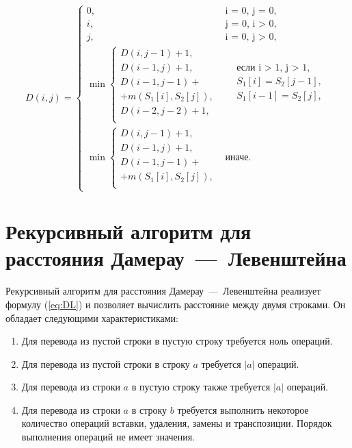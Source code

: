 \begin{equation}
	\label{eq:DL}
	D(i, j) = 
	\begin{cases}
		0, &\text{i = 0, j = 0,}\\
		i, &\text{j = 0, i > 0,}\\
		j, &\text{i = 0, j > 0,}\\
		\min \begin{cases}
			D(i, j - 1) + 1,\\
			D(i - 1, j) + 1,\\
			D(i - 1, j - 1) +\\
			+ m(S_{1}[i], S_{2}[j]),\\
			D(i - 2, j - 2) + 1,\\
		\end{cases}
		& \begin{aligned}
			& \text{если i > 1, j > 1},\\
			& S_{1}[i] = S_{2}[j-1],\\
			& S_{1}[i-1] = S_{2}[j],\\
		\end{aligned}\\
		\min \begin{cases}
			D(i, j - 1) + 1,\\
			D(i - 1, j) + 1,\\
			D(i - 1, j - 1) +\\
			+m(S_{1}[i], S_{2}[j]),\\
		\end{cases}
		 & \text{иначе.}
	\end{cases}
\end{equation}

\section{Рекурсивный алгоритм для расстояния Дамерау~---~Левенштейна}

Рекурсивный алгоритм для расстояния Дамерау~---~Левенштейна реализует формулу (\ref{eq:DL}) и позволяет вычислить расстояние между двумя строками. 
Он обладает следующими характеристиками:

\begin{enumerate}
	\item Для перевода из пустой строки в пустую строку требуется ноль операций.
	\item Для перевода из пустой строки в строку $a$ требуется $|a|$ операций.
	\item Для перевода из строки $a$ в пустую строку также требуется $|a|$ операций.
	\item Для перевода из строки $a$ в строку $b$ требуется выполнить некоторое количество операций вставки, удаления, замены и транспозиции. Порядок выполнения операций не имеет значения. 
\end{enumerate}

